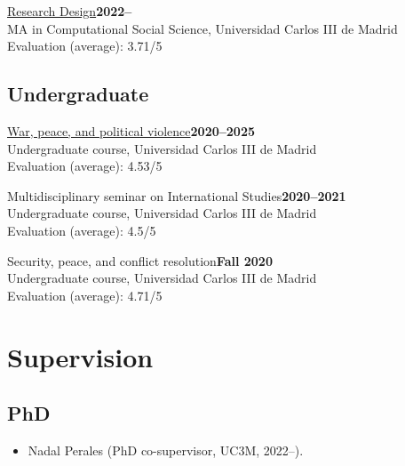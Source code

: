 \documentclass[a4paper, 12pt]{article}
\begin{document}
\noindent
\href{https://github.com/franvillamil/syllabi/blob/master/current/syllabus_research_design.pdf}{Research Design}\hfill\textbf{2022--}\\
{\small MA in Computational Social Science, Universidad Carlos III de Madrid}\\
{\small Evaluation (average): 3.71/5} %

\subsection*{Undergraduate}

\noindent
\href{https://github.com/franvillamil/syllabi/blob/master/current/syllabus_war_peace_political_violence.pdf}{War, peace, and political violence}\hfill\textbf{2020--2025}\\
{\small Undergraduate course, Universidad Carlos III de Madrid}\\
{\small Evaluation (average): 4.53/5} %
\vspace{10pt}

\noindent
Multidisciplinary seminar on International Studies\hfill\textbf{2020--2021}\\
{\small Undergraduate course, Universidad Carlos III de Madrid}\\
{\small Evaluation (average): 4.5/5} %
\vspace{10pt}

\noindent
Security, peace, and conflict resolution\hfill\textbf{Fall 2020}\\
{\small Undergraduate course, Universidad Carlos III de Madrid}\\
{\small Evaluation (average): 4.71/5} %

\section*{Supervision}

\subsection*{PhD}

\begin{itemize}[leftmargin=*, nolistsep]
	\item Nadal Perales (PhD co-supervisor, UC3M, 2022--).
\end{itemize}
\end{document}
